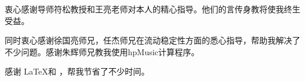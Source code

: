 \begin{acknowledgement}
  衷心感谢导师符松教授和王亮老师对本人的精心指导。他们的言传身教将使我终生受益。

  同时衷心感谢徐国亮师兄，任杰师兄在流动稳定性方面的悉心指导，帮助我解决了不少问题。感谢朱辉师兄教我使用hpMusic计算程序。

  感谢 \LaTeX 和 \thuthesis\cite{thuthesis}，帮我节省了不少时间。
\end{acknowledgement}
